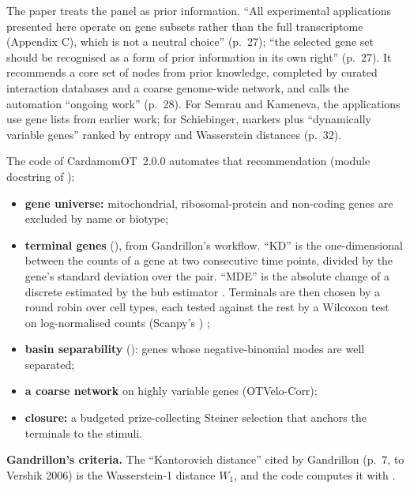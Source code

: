 \documentclass[11pt,a4paper]{article}
\begin{document}
The paper treats the panel as prior information. \enquote{All experimental applications presented here
operate on gene subsets rather than the full transcriptome (Appendix C), which is not a neutral choice}
(p.~27); \enquote{the selected gene set should be recognised as a form of prior information in its own
right} (p.~27). It recommends a core set of nodes from prior knowledge, completed by curated interaction
databases and a coarse genome-wide network, and calls the automation \enquote{ongoing work} (p.~28). For
Semrau and Kameneva, the applications use gene lists from earlier work; for Schiebinger, markers plus
\enquote{dynamically variable genes} ranked by entropy and Wasserstein distances (p.~32).

The code of CardamomOT~2.0.0 automates that recommendation (module docstring of
):
\begin{itemize}
  \item \textbf{gene universe:} mitochondrial, ribosomal-protein and non-coding genes are excluded by name
        or biotype;
  \item \textbf{terminal genes} (), from Gandrillon's workflow.
        \enquote{KD} is the one-dimensional  between the
        counts of a gene at two consecutive time points, divided by the gene's standard deviation over
        the pair. \enquote{MDE} is the absolute change of a discrete
         estimated by the \gls{bub} estimator \parencite{paninskiEstimationEntropyMutual2003}. Terminals are then chosen by a round robin over cell
        types, each tested against the rest by a Wilcoxon test on log-normalised counts (Scanpy's
        ) \parencite{wolfSCANPYLargescaleSinglecell2018};
  \item \textbf{basin separability} (): genes whose negative-binomial modes
        are well separated;
  \item \textbf{a coarse network} on highly variable genes (OTVelo-Corr);
  \item \textbf{closure:} a budgeted prize-collecting Steiner selection that anchors the terminals to the
        stimuli.
\end{itemize}

\textbf{Gandrillon's criteria.} The \enquote{Kantorovich distance} cited by Gandrillon (p.~7, to Vershik
2006) is the Wasserstein-1 distance $W_1$, and the code computes it with
.
\end{document}
